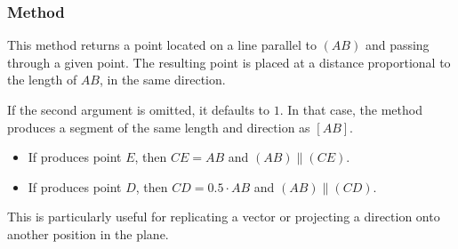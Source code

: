 \subsubsection{Method } %
\label{ssub:method_line_colinear__at}

This method returns a point located on a line parallel to $(AB)$ and passing through a given point. The resulting point is placed at a distance proportional to the length of $AB$, in the same direction.

\medskip
\noindent
If the second argument  is omitted, it defaults to $1$. In that case, the method produces a segment of the same length and direction as $[AB]$.

\medskip
\noindent
{}
\begin{itemize}
  \item If  produces point $E$, then $CE = AB$ and $(AB) \parallel (CE)$.
  \item If  produces point $D$, then $CD = 0.5 \cdot AB$ and $(AB) \parallel (CD)$.
\end{itemize}

\noindent
This is particularly useful for replicating a vector or projecting a direction onto another position in the plane.

\vspace{1em}
\begin{minipage}{.5\textwidth}
\begin{center}
\end{center}
\end{minipage}
\begin{minipage}{.5\textwidth}
\begin{tkzexample}
\end{tkzexample}
\end{minipage}


